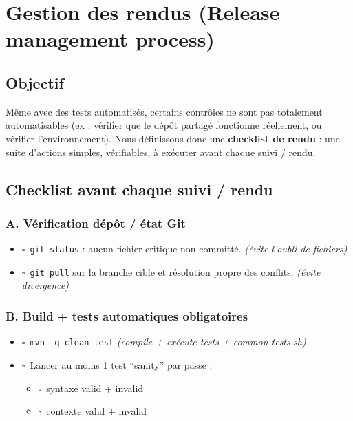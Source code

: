 \documentclass[11pt,a4paper]{article}
\newcommand{\checkbox}{\(\square\)}
\begin{document}
\section{Gestion des rendus (Release management process)}

\subsection{Objectif}
Même avec des tests automatisés, certains contrôles ne sont pas totalement automatisables
(ex : vérifier que le dépôt partagé fonctionne réellement, ou vérifier l'environnement).
Nous définissons donc une \textbf{checklist de rendu} : une suite d'actions simples, vérifiables,
à exécuter avant chaque suivi / rendu.

\subsection{Checklist avant chaque suivi / rendu}
\subsubsection*{A. Vérification dépôt / état Git}
\begin{itemize}[leftmargin=*, itemsep=0.2em]
\item \checkbox\ \texttt{git status} : aucun fichier critique non committé. \textit{(évite l'oubli de fichiers)}
\item \checkbox\ \texttt{git pull} sur la branche cible et résolution propre des conflits. \textit{(évite divergence)}
\end{itemize}

\subsubsection*{B. Build + tests automatiques obligatoires}
\begin{itemize}[leftmargin=*, itemsep=0.2em]
\item \checkbox\ \texttt{mvn -q clean test} \textit{(compile + exécute tests + common-tests.sh)}
\item \checkbox\ Lancer au moins 1 test ``sanity'' par passe :
\begin{itemize}[leftmargin=*, nosep]
\item \checkbox\ syntaxe valid + invalid
\item \checkbox\ contexte valid + invalid
\end{itemize}
\end{itemize}
\end{document}
